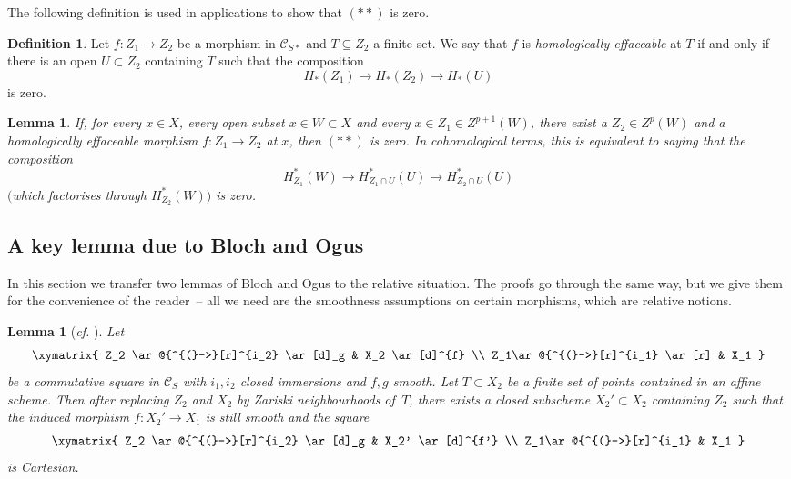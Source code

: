 \documentclass[11pt]{amsart}
\numberwithin{equation}{section}
\newtheorem{lemma}[theorem]{Lemma}
\newtheorem{Key lemma}[theorem]{Key lemma}
\theoremstyle{definition}
\newtheorem{definition}[theorem]{Definition}
\theoremstyle{remark}
\newcommand{\To}{\longrightarrow}
\newcommand{\cal}{\mathcal}
\begin{document}
The following definition is used in applications to show that $(**)$ is zero.

\begin{definition}
Let $f\colon Z_1\to Z_2$ be a morphism in $\cal C_{S*}$ and $T\subseteq Z_2$ a finite set. We say that $f$ is \textit{homologically effaceable} at $T$ if and only if there is an open $U\subset Z_2$ containing $T$ such that the composition
$$
H_*(Z_1)\To H_*(Z_2)\To H_*(U)
$$
is zero.
\end{definition}

\begin{lemma}\label{lemma_effaceability}
If, for every $x\in X$, every open subset $x\in W\subset X$ and every $x\in Z_1\in Z^{p+1}(W)$, there exist a $Z_2\in Z^p(W)$ and a homologically effaceable morphism $f\colon Z_1\to Z_2$ at $x$, then $(**)$ is zero. In cohomological terms, this is equivalent to saying that the composition 
$$
H^*_{Z_1}(W)\To H^*_{Z_1\cap U}(U)\To H^*_{Z_2\cap U}(U)
$$
$($which factorises through $H^*_{Z_2}(W))$ is zero.
\end{lemma}

\subsection{A key lemma due to Bloch and Ogus}
In this section we transfer two lemmas of Bloch and Ogus to the relative situation. The proofs go through the same way, but we give them for the convenience of the reader~-- all we need are the smoothness assumptions on certain morphisms, which are relative notions. 

\begin{lemma}[\textit{cf.} {\cite[Lemma~5.1]{BO74}}]\label{lemma_cartesian_square}
Let 
\[
  \xymatrix{ 
  Z_2 \ar@{^{(}->}[r]^{i_2}  \ar[d]_g & X_2 \ar[d]^{f}  \\
   Z_1\ar@{^{(}->}[r]^{i_1} \ar[r] & X_1 
   }
\]
be a commutative square in $\cal C_S$ with $i_1,i_2$ closed immersions and $f,g$ smooth. Let $T\subset X_2$ be a finite set of points contained in an affine scheme. Then after replacing $Z_2$ and $X_2$ by Zariski neighbourhoods of\, $T$, there exists a closed subscheme $X_2'\subset X_2$ containing $Z_2$ such that the induced morphism $f\colon X_2'\to X_1$ is still smooth and the square
\[
  \xymatrix{ 
  Z_2 \ar@{^{(}->}[r]^{i_2}  \ar[d]_g & X_2' \ar[d]^{f'}  \\
   Z_1\ar@{^{(}->}[r]^{i_1}  & X_1 
   }
\]
is Cartesian.
\end{lemma}
\end{document}

